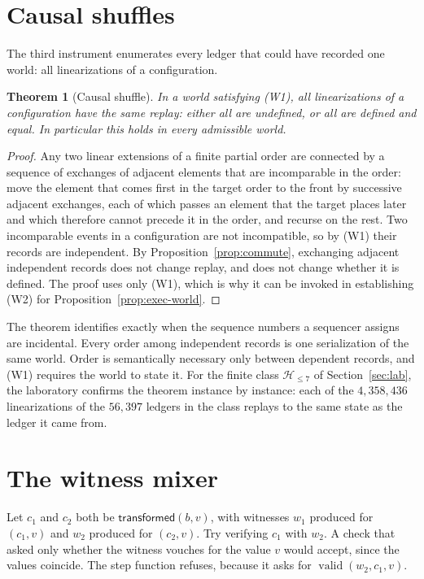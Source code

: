 \documentclass[11pt,openany]{book}
\newtheorem{theorem}{Theorem}[chapter]
\theoremstyle{remark}
\newcommand{\valid}{\operatorname{valid}}
\begin{document}
\section{Causal shuffles}

The third instrument enumerates every ledger that could have recorded one
world: all linearizations of a configuration.

\begin{theorem}[Causal shuffle]\label{thm:shuffle}
In a world satisfying (W1), all linearizations of a configuration have
the same replay: either all are undefined, or all are defined and equal.
In particular this holds in every admissible world.
\end{theorem}

\begin{proof}
Any two linear extensions of a finite partial order are connected by a
sequence of exchanges of adjacent elements that are incomparable in the
order: move the element that comes first in the target order to the front
by successive adjacent exchanges, each of which passes an element that the
target places later and which therefore cannot precede it in the order,
and recurse on the rest. Two incomparable events in a configuration are not
incompatible, so by (W1) their records are independent. By
Proposition~\ref{prop:commute}, exchanging adjacent independent records
does not change replay, and does not change whether it is defined.
The proof uses only (W1), which is why it can be invoked in establishing
(W2) for Proposition~\ref{prop:exec-world}.
\end{proof}

The theorem identifies exactly when the sequence numbers a sequencer
assigns are incidental. Every order among independent records is one
serialization of the same world. Order is semantically necessary only
between dependent records, and (W1) requires the world to state it. For
the finite class $\mathcal H_{\le 7}$ of Section~\ref{sec:lab}, the
laboratory confirms the theorem instance by instance: each of the
$4{,}358{,}436$ linearizations of the $56{,}397$ ledgers in the class replays
to the same state as the ledger it came from.

\section{The witness mixer}

Let $c_1$ and $c_2$ both be $\mathsf{transformed}(b,v)$, with witnesses
$w_1$ produced for $(c_1,v)$ and $w_2$ produced for $(c_2,v)$. Try verifying
$c_1$ with $w_2$. A check that asked only whether the witness vouches for
the value $v$ would accept, since the values coincide. The step function
refuses, because it asks for $\valid(w_2,c_1,v)$.
\end{document}
